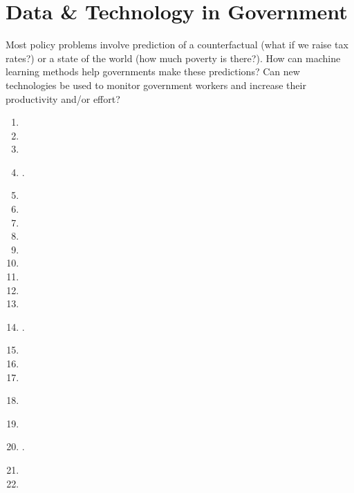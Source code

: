 \documentclass[11pt]{article}
\begin{document}
\section{Data \& Technology in Government}
Most policy problems involve prediction of a counterfactual (what if we raise tax rates?) or a state of the world (how much poverty is there?). How can machine learning methods help governments make these predictions? Can new technologies be used to monitor government workers and increase their productivity and/or effort?

\begin{enumerate}
\item {}
\item {}
\item {}
\item {}.
\item {}
\item {}
\item {}
\item {}
\item {}
\item {}
\item {}
\item {}
\item {}
\item {}.
\item {}
\item {}
\item {}
\item \textbf{}
\item \textbf{}
\item {}.
\item {}
\item {}
\end{enumerate}


\end{document}
